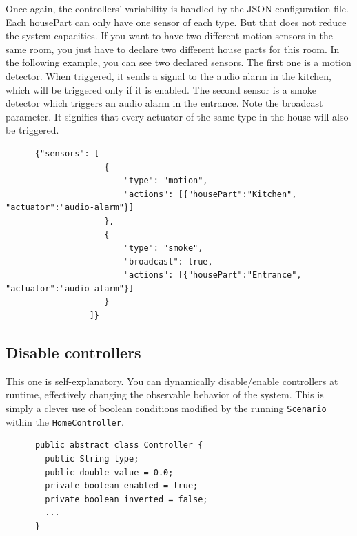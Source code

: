       Once again, the controllers' variability is handled by the JSON configuration file. Each housePart can only have one sensor of each type. But that does not reduce the system capacities. If you want to have two different motion sensors in the same room, you just have to declare two different house parts for this room. In the following example, you can see two declared sensors.
      The first one is a motion detector. When triggered, it sends a signal to the audio alarm in the kitchen, which will be triggered only if it is enabled.
      The second sensor is a smoke detector which triggers an audio alarm in the entrance. Note the broadcast parameter. It signifies that every actuator of the same type in the house will also be triggered.
      \begin{verbatim}
      {"sensors": [
                    {
                        "type": "motion",
                        "actions": [{"housePart":"Kitchen", "actuator":"audio-alarm"}]
                    },
                    {
                        "type": "smoke",
                        "broadcast": true,
                        "actions": [{"housePart":"Entrance", "actuator":"audio-alarm"}]
                    }
                 ]}
      \end{verbatim}

    \subsection{Disable controllers}
      This one is self-explanatory. You can dynamically disable/enable controllers at runtime, effectively changing the observable behavior of the system. This is simply a clever use of boolean conditions modified by the running \texttt{Scenario} within the \texttt{HomeController}.
      \begin{verbatim}
      public abstract class Controller {
        public String type;
        public double value = 0.0;
        private boolean enabled = true;
        private boolean inverted = false;
        ...
      }
      \end{verbatim}

